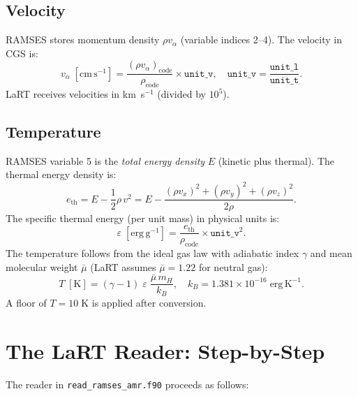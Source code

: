 \documentclass[english,a4paper]{my_memo}
\begin{document}
\subsection{Velocity}

RAMSES stores momentum density $\rho v_\alpha$ (variable indices 2--4).
The velocity in CGS is:
\begin{equation}
  v_\alpha \;[\mathrm{cm\,s}^{-1}]
  = \frac{(\rho v_\alpha)_\mathrm{code}}{\rho_\mathrm{code}}
    \times \texttt{unit\_v},
  \quad \texttt{unit\_v} = \frac{\texttt{unit\_l}}{\texttt{unit\_t}}.
\end{equation}
LaRT receives velocities in km~s$^{-1}$ (divided by $10^5$).

\subsection{Temperature}

RAMSES variable 5 is the \emph{total energy density} $E$ (kinetic plus
thermal).  The thermal energy density is:
\begin{equation}
  e_\mathrm{th} = E - \frac{1}{2}\rho\,v^2
  = E - \frac{(\rho v_x)^2 + (\rho v_y)^2 + (\rho v_z)^2}{2\rho}.
\end{equation}
The specific thermal energy (per unit mass) in physical units is:
\begin{equation}
  \varepsilon \;[\mathrm{erg\,g}^{-1}]
  = \frac{e_\mathrm{th}}{\rho_\mathrm{code}}
    \times \texttt{unit\_v}^2.
\end{equation}
The temperature follows from the ideal gas law with adiabatic index $\gamma$
and mean molecular weight $\bar\mu$ (LaRT assumes $\bar\mu = 1.22$ for
neutral gas):
\begin{equation}
  T \;[\mathrm{K}]
  = (\gamma - 1)\;\varepsilon\;
    \frac{\bar\mu\,m_H}{k_B},
  \quad k_B = 1.381 \times 10^{-16}\;\mathrm{erg\,K}^{-1}.
\end{equation}
A floor of $T = 10\;\mathrm{K}$ is applied after conversion.

\section{The LaRT Reader: Step-by-Step}

The reader in \texttt{read\_ramses\_amr.f90} proceeds as follows:
\end{document}
